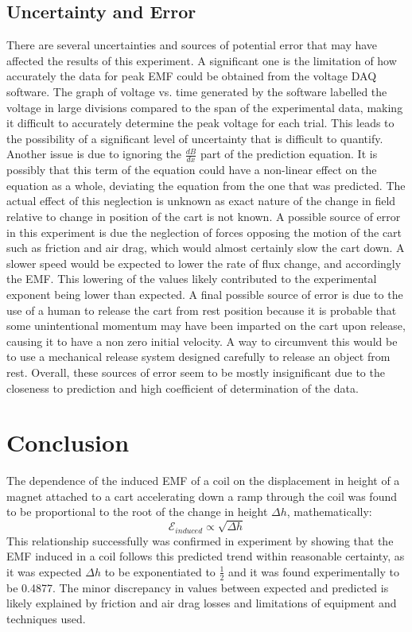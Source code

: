 \documentclass[12pt,letterpaper]{article}
\begin{document}
\subsection*{Uncertainty and Error}
There are several uncertainties and sources of potential error that may have affected the results of this experiment. A significant one is the limitation of how accurately the data for peak EMF could be obtained from the voltage DAQ software. The graph of voltage vs. time generated by the software labelled the voltage in large divisions compared to the span of the experimental data, making it difficult to accurately determine the peak voltage for each trial. This leads to the possibility of a significant level of uncertainty that is difficult to quantify. Another issue is due to ignoring the $\frac{dB}{dx}$ part of the prediction equation. It is possibly that this term of the equation could have a non-linear effect on the equation as a whole, deviating the equation from the one that was predicted. The actual effect of this neglection is unknown as exact nature of the change in field relative to change in position of the cart is not known. A possible source of error in this experiment is due the neglection of forces opposing the motion of the cart such as friction and air drag, which would almost certainly slow the cart down. A slower speed would be expected to lower the rate of flux change, and accordingly the EMF. This lowering of the values likely contributed to the experimental exponent being lower than expected. A final possible source of error is due to the use of a human to release the cart from rest position because it is probable that some unintentional momentum may have been imparted on the cart upon release, causing it to have a non zero initial velocity. A way to circumvent this would be to use a mechanical release system designed carefully to release an object from rest. Overall, these sources of error seem to be mostly insignificant due to the closeness to prediction and high coefficient of determination of the data. 
\section*{Conclusion}
The dependence of the induced EMF of a coil on the displacement in height of a magnet attached to a cart accelerating down a ramp through the coil was found to be proportional to the root of the change in height $\Delta h$, mathematically:
\begin{equation}
\mathcal{E}_{induced} \propto \sqrt{\Delta h}
\end{equation}
This relationship successfully was confirmed in experiment by showing that the EMF induced in a coil follows this predicted trend within reasonable certainty, as it was expected $\Delta h$ to be exponentiated to $\frac{1}{2}$ and it was found experimentally to be 0.4877. The minor discrepancy in values between expected and predicted is likely explained by friction and air drag losses and limitations of equipment and techniques used. \par\vspace{12pt}
\end{document}
